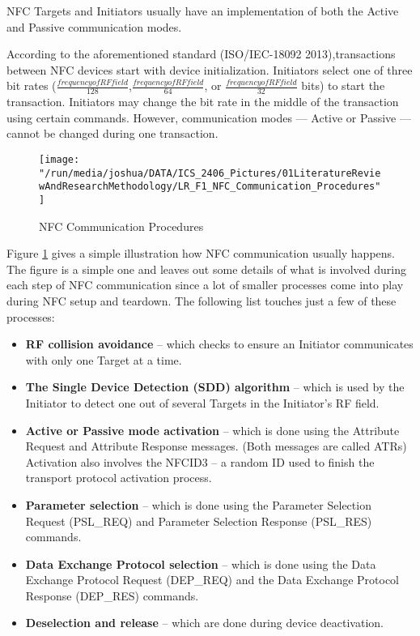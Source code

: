 \documentclass[12pt,svgnames,smaller]{article} %
\begin{document}
\begin{enumerate}
		NFC Targets and Initiators usually have an implementation of both the Active and Passive communication modes. 
		
		According to the aforementioned standard (ISO/IEC-18092 2013),transactions between NFC devices start with device initialization. Initiators select one of three bit rates ($\tfrac{frequency of RF field}{128}$,$\tfrac{frequency of RF field}{64}$, or $\tfrac{frequency of RF field}{32}$ bits) to start the transaction. Initiators may change the bit rate in the middle of the transaction using certain commands. However, communication modes --- Active or Passive --- cannot be changed during one transaction. 
		
		\begin{figure}
			\centering
			\texttt{[image: "/run/media/joshua/DATA/ICS\_2406\_Pictures/01LiteratureReviewAndResearchMethodology/LR\_F1\_NFC\_Communication\_Procedures"]}
			\caption{NFC Communication Procedures}
			\label{fig:LiteratureReview-Figure1}
		\end{figure}
		
		Figure \ref{fig:LiteratureReview-Figure1} gives a simple illustration how NFC communication usually happens. The figure is a simple one and leaves out some details of what is involved during each step of NFC communication since a lot of smaller processes come into play during NFC setup and teardown. The following list touches just a few of these processes:
		
		\begin{itemize}
			\item \textbf{RF collision avoidance} – which checks to ensure an Initiator communicates with only one Target at a time.
			\item \textbf{The Single Device Detection (SDD) algorithm} – which is used by the Initiator to detect one out of several Targets in the Initiator’s RF field.
			\item \textbf{Active or Passive mode activation} – which is done using the Attribute Request and Attribute Response messages. (Both messages are called ATRs) Activation also involves the NFCID3 – a random ID used to finish the transport protocol activation process.
			\item \textbf{Parameter selection} – which is done using the Parameter Selection Request (PSL\_REQ) and Parameter Selection Response (PSL\_RES) commands.
			\item \textbf{Data Exchange Protocol selection} – which is done using the Data Exchange Protocol Request (DEP\_REQ) and the Data Exchange Protocol Response (DEP\_RES) commands.
			\item \textbf{Deselection  and release} – which are done during device deactivation. 
		\end{itemize}
		

\end{enumerate}
\end{document}
